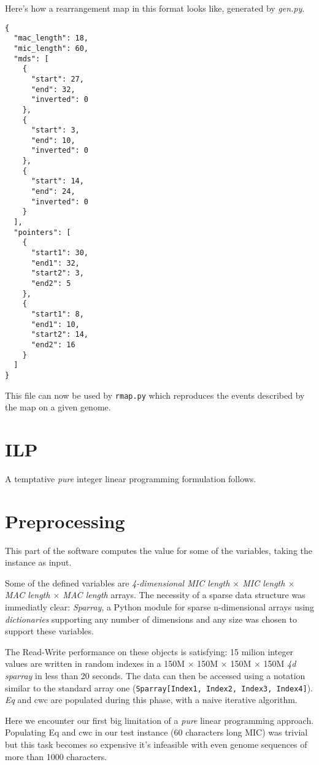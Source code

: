 Here's how a rearrangement map in this format looks like, generated by \textit{gen.py}.

\begin{verbatim}
{
  "mac_length": 18,
  "mic_length": 60,
  "mds": [
    {
      "start": 27,
      "end": 32,
      "inverted": 0
    },
    {
      "start": 3,
      "end": 10,
      "inverted": 0
    },
    {
      "start": 14,
      "end": 24,
      "inverted": 0
    }
  ],
  "pointers": [
    {
      "start1": 30,
      "end1": 32,
      "start2": 3,
      "end2": 5
    },
    {
      "start1": 8,
      "end1": 10,
      "start2": 14,
      "end2": 16
    }
  ]
}
\end{verbatim}

This file can now be used by \texttt{rmap.py} which reproduces the events described by the map on a given genome.

\section{ILP}
A temptative \textit{pure} integer linear programming formulation follows.



\section{Preprocessing}
This part of the software computes the value for some of the variables, taking the instance as input.

Some of the defined variables are \textit{4-dimensional MIC length $\times$ MIC length $\times$ MAC length $\times$ MAC length} arrays. The necessity of a sparse data structure was immediatly clear: \textit{Sparray}, a Python module \cite{sparray} for sparse n-dimensional arrays using \textit{dictionaries} supporting any number of dimensions and any size was chosen to support these variables.

The Read-Write performance on these objects is satisfying: 15 milion integer values are written in random indexes in a 150M $\times$ 150M $\times$ 150M $\times$ 150M \textit{4d sparray} in less than 20 seconds. The data can then be accessed using a notation similar to the standard array one (\texttt{Sparray[Index1, Index2, Index3, Index4]}). \textit{Eq} and {cwc} are populated during this phase, with a naive iterative algorithm.

Here we encounter our first big limitation of a \textit{pure} linear programming approach. Populating Eq and cwc in our test instance (60 characters long MIC) was trivial but this task becomes so expensive it's infeasible with even genome sequences of more than 1000 characters.

